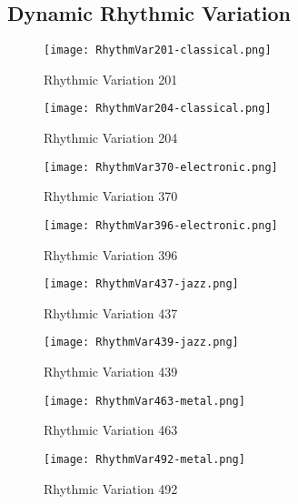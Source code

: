 \documentclass{article} %
\begin{document}
\subsection{Dynamic Rhythmic Variation}
\label{sec:rhythmVar}

\begin{figure}[H]
\centering
\texttt{[image: RhythmVar201-classical.png]}
\caption{Rhythmic Variation 201}
\label{fig:rhythmVar201_1}
\end{figure}

\begin{figure}[H]
\centering
\texttt{[image: RhythmVar204-classical.png]}
\caption{Rhythmic Variation 204}
\label{fig:rhythmVar204_1}
\end{figure}


\begin{figure}[H]
\centering
\texttt{[image: RhythmVar370-electronic.png]}
\caption{Rhythmic Variation 370}
\label{fig:rhythmVar370_1}
\end{figure}

\begin{figure}[H]
\centering
\texttt{[image: RhythmVar396-electronic.png]}
\caption{Rhythmic Variation 396}
\label{fig:rhythmVar396_1}
\end{figure}

\begin{figure}[H]
\centering
\texttt{[image: RhythmVar437-jazz.png]}
\caption{Rhythmic Variation 437}
\label{fig:rhythmVar437_1}
\end{figure}

\begin{figure}[H]
\centering
\texttt{[image: RhythmVar439-jazz.png]}
\caption{Rhythmic Variation 439}
\label{fig:rhythmVar439_1}
\end{figure}

\begin{figure}[H]
\centering
\texttt{[image: RhythmVar463-metal.png]}
\caption{Rhythmic Variation 463}
\label{fig:rhythmVar463_1}
\end{figure}

\begin{figure}[H]
\centering
\texttt{[image: RhythmVar492-metal.png]}
\caption{Rhythmic Variation 492}
\label{fig:rhythmVar492_1}
\end{figure}
\end{document}
